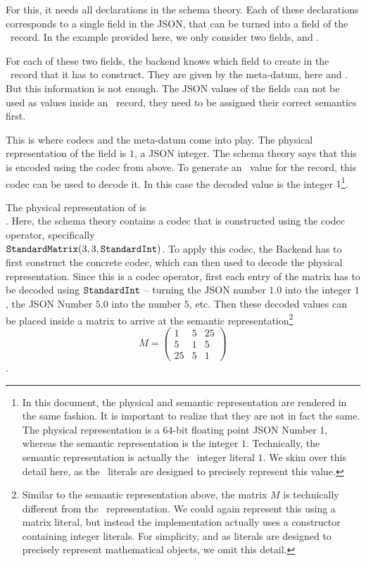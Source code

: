 For this, it needs all declarations in the schema theory. 
Each of these declarations corresponds to a single field in the JSON, that can be turned into a field of the \mmt\ record. 
In the example provided here, we only consider two fields,  and . 

For each of these two fields, the backend knows which field to create in the \mmt\ record that it has to construct. 
They are given by the  meta-datum, here  and . 
But this information is not enough. 
The JSON values of the fields can not be used as values inside an \mmt\ record, they need to be assigned their correct semantics first. 

This is where codecs and the  meta-datum come into play. 
The physical representation of the  field is $1$, a JSON integer. 
The schema theory says that this is encoded using the  codec from above. 
To generate an \mmt\ value for the record, this codec can be used to decode it. 
In this case the decoded value is the integer $1$\footnote{
  In this document, the physical and semantic representation are rendered in the same fashion. 
  It is important to realize that they are not in fact the same. 
  The physical representation is a 64-bit floating point JSON Number $1$, whereas the semantic representation is the integer $1$. 
  Technically, the semantic representation is actually the \omdocmmt\ integer literal $1$. 
  We skim over this detail here, as the \omdocmmt\ literals are designed to precisely represent this value. 
}. 

The physical representation of  is \\\inlinecode{[[1.0,5.0,25.0],[5.0,1.0,5.0],[25.0,5.0,1.0]]}. 
Here, the schema theory contains a codec that is constructed using the  codec operator, specifically \\$\plaintt{StandardMatrix}(3, 3, \plaintt{StandardInt})$. 
To apply this codec, the Backend has to first construct the concrete codec, which can then used to decode the physical representation. 
Since this is a codec operator, first each entry of the matrix has to be decoded using $\plaintt{StandardInt}$ -- turning the JSON number $1.0$ into the integer $1$, the JSON Number $5.0$ into the number $5$, etc. 
Then these decoded values can be placed inside a matrix to arrive at the semantic representation\footnote{
  Similar to the semantic representation above, the matrix $M$ is technically different from the \omdocmmt\ representation. 
  We could again represent this using a matrix literal, but instead the implementation actually uses a constructor containing integer literals. 
  For simplicity, and as literals are designed to precisely represent mathematical objects, we omit this detail. 
} $$M = \left( \begin{array}{ccc}
1 & 5 & 25 \\
5 & 1 & 5 \\
25 & 5 & 1 \end{array} \right) $$. 

